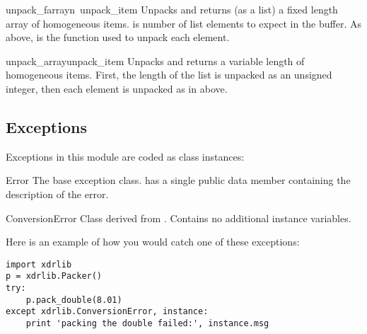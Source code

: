 \begin{funcdesc}{unpack_farray}{n\, unpack_item}
Unpacks and returns (as a list) a fixed length array of homogeneous
items.   is number of list elements to expect in the buffer.
As above,  is the function used to unpack each element.
\end{funcdesc}

\begin{funcdesc}{unpack_array}{unpack_item}
Unpacks and returns a variable length  of homogeneous items.
First, the length of the list is unpacked as an unsigned integer, then
each element is unpacked as in  above.
\end{funcdesc}

\subsection{Exceptions}

Exceptions in this module are coded as class instances:

\begin{excdesc}{Error}
The base exception class.   has a single public data
member  containing the description of the error.
\end{excdesc}

\begin{excdesc}{ConversionError}
Class derived from .  Contains no additional instance
variables.
\end{excdesc}

Here is an example of how you would catch one of these exceptions:

\bcode\begin{verbatim}
import xdrlib
p = xdrlib.Packer()
try:
    p.pack_double(8.01)
except xdrlib.ConversionError, instance:
    print 'packing the double failed:', instance.msg
\end{verbatim}\ecode

